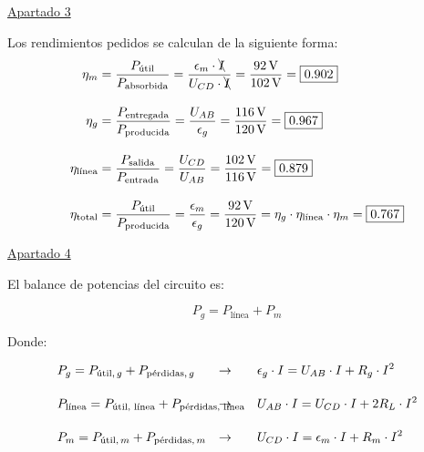 \begin{example}
\vspace{6mm}

\underline{Apartado 3}

\vspace{5mm}

Los rendimientos pedidos se calculan de la siguiente forma:
\begin{align*}
  \eta_m &= \frac{P_{\textrm{útil}}}{P_{\textrm{absorbida}}} = \frac{\epsilon_m \cdot \bcancel{I}}{U_{CD} \cdot \bcancel{I}} = \frac{\qty{92}{\volt}}{\qty{102}{\volt}}  = \boxed{0.902}\\[10pt]
  \eta_g &= \frac{P_{\textrm{entregada}}}{P_{\textrm{producida}}} = \frac{U_{AB}}{\epsilon_g} = \frac{\qty{116}{\volt}}{\qty{120}{\volt}} = \boxed{0.967}\\[10pt]
  \eta_{\textrm{línea}} &= \frac{P_{\textrm{salida}}}{P_{\textrm{entrada}}} = \frac{U_{CD}}{U_{AB}} = \frac{\qty{102}{\volt}}{\qty{116}{\volt}} = \boxed{0.879}\\[10pt]
  \eta_{\textrm{total}} &= \frac{P_{\textrm{útil}}}{P_{\textrm{producida}}} = \frac{\epsilon_m}{\epsilon_g} = \frac{\qty{92}{\volt}}{\qty{120}{\volt}} = \eta_g \cdot \eta_{\textrm{línea}} \cdot \eta_m = \boxed{0.767}
\end{align*}

\vspace{2mm}

\underline{Apartado 4}

\vspace{5mm}

El balance de potencias del circuito es:

\[
  P_{g} = P_{\textrm{línea}} + P_{m}
\]

Donde:

\vspace{-3mm}
\begin{align*}
  & P_{g} = P_{\textrm{útil}, \, g} + P_{\textrm{pérdidas}, \, g} & \rightarrow \qquad & \epsilon_g \cdot I = U_{AB} \cdot I + R_g \cdot I^2 \\[10pt]
  & P_{\textrm{línea}} = P_{\textrm{útil, línea}} + P_{\textrm{pérdidas, línea}} \hspace{-20mm} & \rightarrow \qquad & U_{AB} \cdot I = U_{CD} \cdot I + 2 R_L \cdot I^2\\[10pt]
  & P_{m} = P_{\textrm{útil}, \, m} + P_{\textrm{pérdidas}, \, m} & \rightarrow \qquad & U_{CD} \cdot I = \epsilon_m \cdot I + R_m \cdot I^2 
\end{align*}
	    
\end{example}



